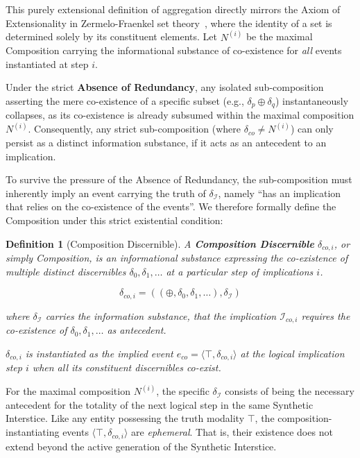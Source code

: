 \documentclass[11pt, a4paper]{article}
\theoremstyle{formalism}
\newtheorem{formalism}{Definition}
\begin{document}
This purely extensional definition of aggregation directly mirrors the Axiom of
Extensionality in Zermelo-Fraenkel set theory~\cite{Zermelo1908}, where the
identity of a set is determined solely by its constituent elements. Let $N^{(i)}$
be the maximal Composition carrying the informational substance of co-existence
for \textit{all} events instantiated at step $i$. 

Under the strict \textbf{Absence of Redundancy}, any isolated sub-composition
asserting the mere co-existence of a specific subset (e.g., $\delta_p \oplus
\delta_q$) instantaneously collapses, as its co-existence is already subsumed
within the maximal composition $N^{(i)}$. Consequently, any strict
sub-composition (where $\delta_{co} \neq N^{(i)}$) can only persist as a distinct
information substance, if it acts as an antecedent to an implication. 

To survive the pressure of the Absence of Redundancy, the sub-composition must
inherently imply an event carrying the truth of $\delta_{\mathcal{I}}$,
namely ``has an implication that relies on the co-existence of the events''.
We therefore formally define the Composition under this strict existential condition:

\begin{formalism}[Composition Discernible]

    A \textbf{Composition Discernible} $\delta_{co,i}$, or simply
    \textit{Composition}, is an informational substance expressing the
    co-existence of multiple distinct discernibles $\delta_0, \delta_1, \ldots$ 
    at a particular step of implications $i$.

    \begin{equation}
        \delta_{co,i} = ((\oplus, \delta_0, \delta_1, \ldots),  \delta_{\mathcal{I}}) 
    \end{equation}

    where $\delta_{\mathcal{I}}$ carries the information substance, that the 
    implication $\mathcal{I}_{co,i}$ requires the co-existence of 
    $\delta_0, \delta_1, \ldots$ as antecedent.

    $\delta_{co,i}$ is instantiated as the implied event $e_{co} = \langle
    \top, \delta_{co,i} \rangle$ at the logical implication step $i$ when all
    its constituent discernibles co-exist. 

\end{formalism}

For the maximal composition $N^{(i)}$, the specific $\delta_{\mathcal{I}}$
consists of being the necessary antecedent for the totality of the next logical
step in the same Synthetic Interstice. Like any entity possessing the truth
modality $\top$, the composition-instantiating events $\langle \top,
\delta_{co,i} \rangle$ are \textit{ephemeral}. That is,  their existence does
not extend beyond the active generation of the Synthetic Interstice.
\end{document}
